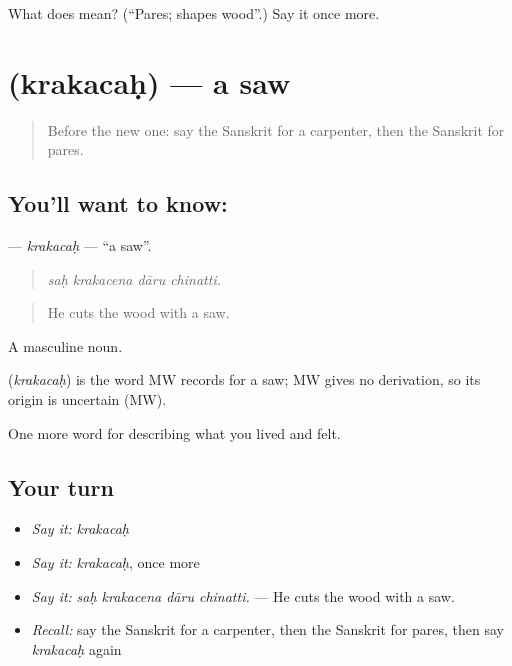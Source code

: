 \begin{tcolorbox}[breakable,colback=teal!4,colframe=teal!35!black,title={Before you move on}]
What does  mean? (\textquotedblleft{}Pares; shapes wood\textquotedblright{}.) Say it once more.
\end{tcolorbox}
\section[\texorpdfstring{\sk{क्रकचः} (krakacaḥ)}{क्रकचः (krakacaḥ)}]{ (krakacaḥ) — a saw}

\label{lesson:SA-C502-krakacah}



\begin{quote}
Before the new one: say the Sanskrit for a carpenter, then the Sanskrit for pares.
\end{quote}

\subsection*{You'll want to know: }
\textbf{} — \emph{krakacaḥ} — \textquotedblleft{}a saw\textquotedblright{}.

\begin{quote}
   
\end{quote}

\begin{quote}
\emph{saḥ krakacena dāru chinatti.}
\end{quote}

\begin{quote}
He cuts the wood with a saw.
\end{quote}

A masculine noun.

\begin{cousinweb}
\textbf{} (\emph{krakacaḥ}) is the word MW records for a saw; MW gives no derivation, so its origin is uncertain (MW).
\end{cousinweb}

\begin{grammarlens}[title={What you've built}]
One more word for describing what you lived and felt.
\end{grammarlens}

\subsection*{Your turn}
\begin{itemize}
\raggedright
  \item \emph{Say it:} \emph{krakacaḥ}
  \item \emph{Say it:} \emph{krakacaḥ}, once more
  \item \emph{Say it:} \emph{saḥ krakacena dāru chinatti.} — He cuts the wood with a saw.
  \item \emph{Recall:} say the Sanskrit for a carpenter, then the Sanskrit for pares, then say \emph{krakacaḥ} again
\end{itemize}

